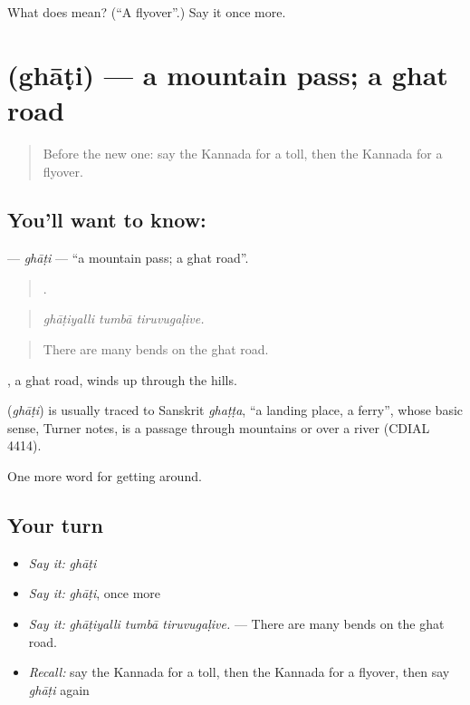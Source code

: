 \begin{tcolorbox}[breakable,colback=teal!4,colframe=teal!35!black,title={Before you move on}]
What does  mean? (\textquotedblleft{}A flyover\textquotedblright{}.) Say it once more.
\end{tcolorbox}
\section[\texorpdfstring{\kn{ಘಾಟಿ} (ghāṭi)}{ಘಾಟಿ (ghāṭi)}]{ (ghāṭi) — a mountain pass; a ghat road}

\label{lesson:KA-C442-ghati}



\begin{quote}
Before the new one: say the Kannada for a toll, then the Kannada for a flyover.
\end{quote}

\subsection*{You'll want to know: }
\textbf{} — \emph{ghāṭi} — \textquotedblleft{}a mountain pass; a ghat road\textquotedblright{}.

\begin{quote}
  .
\end{quote}

\begin{quote}
\emph{ghāṭiyalli tumbā tiruvugaḷive.}
\end{quote}

\begin{quote}
There are many bends on the ghat road.
\end{quote}

 , a ghat road, winds up through the hills.

\begin{cousinweb}
\textbf{} (\emph{ghāṭi}) is usually traced to Sanskrit \emph{ghaṭṭa}, \textquotedblleft{}a landing place, a ferry\textquotedblright{}, whose basic sense, Turner notes, is a passage through mountains or over a river (CDIAL 4414).
\end{cousinweb}

\begin{grammarlens}[title={What you've built}]
One more word for getting around.
\end{grammarlens}

\subsection*{Your turn}
\begin{itemize}
\raggedright
  \item \emph{Say it:} \emph{ghāṭi}
  \item \emph{Say it:} \emph{ghāṭi}, once more
  \item \emph{Say it:} \emph{ghāṭiyalli tumbā tiruvugaḷive.} — There are many bends on the ghat road.
  \item \emph{Recall:} say the Kannada for a toll, then the Kannada for a flyover, then say \emph{ghāṭi} again
\end{itemize}

